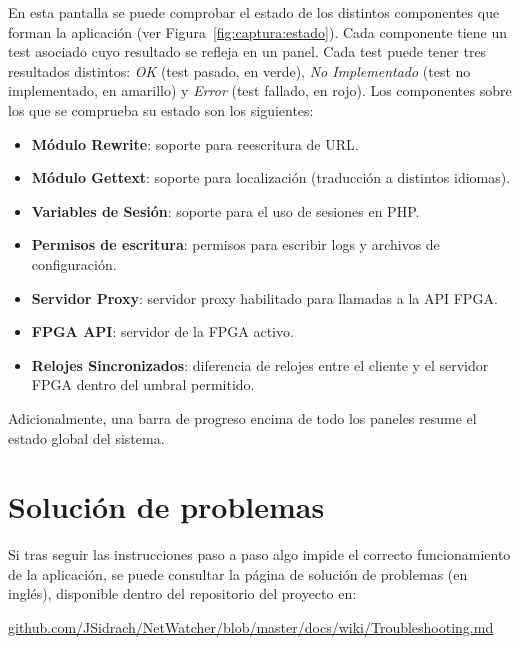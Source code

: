 En esta pantalla se puede comprobar el estado de los distintos componentes que forman la aplicación (ver Figura~\ref{fig:captura:estado}).
Cada componente tiene un test asociado cuyo resultado se refleja en un panel.
Cada test puede tener tres resultados distintos: \textit{OK} (test pasado, en verde), \textit{No Implementado} (test no implementado, en amarillo) y \textit{Error} (test fallado, en rojo).
Los componentes sobre los que se comprueba su estado son los siguientes:
\begin{itemize}
  \item \textbf{Módulo Rewrite}: soporte para reescritura de \gls{URL}.
  \item \textbf{Módulo Gettext}: soporte para localización (traducción a distintos idiomas).
  \item \textbf{Variables de Sesión}: soporte para el uso de sesiones en \gls{PHP}.
  \item \textbf{Permisos de escritura}: permisos para escribir \glspl{log} y archivos de configuración.
  \item \textbf{Servidor Proxy}: servidor proxy habilitado para llamadas a la API \gls{FPGA}.
  \item \textbf{\gls{FPGA} API}: servidor de la \gls{FPGA} activo.
  \item \textbf{Relojes Sincronizados}: diferencia de relojes entre el cliente y el servidor \gls{FPGA} dentro del umbral permitido.
\end{itemize}

Adicionalmente, una barra de progreso encima de todo los paneles resume el estado global del sistema.


\section{Solución de problemas\label{extra:manual:solucion}}

Si tras seguir las instrucciones paso a paso algo impide el correcto funcionamiento de la aplicación, se puede consultar la página de solución de problemas (en inglés), disponible dentro del repositorio del proyecto en:

\href{https://github.com/JSidrach/NetWatcher/blob/master/docs/wiki/Troubleshooting.md}{github.com/JSidrach/NetWatcher/blob/master/docs/wiki/Troubleshooting.md}
